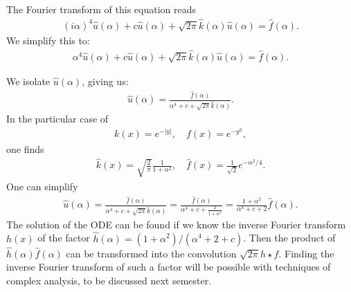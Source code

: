 \documentclass[11pt]{article}
\begin{document}
\begin{solution}
    The Fourier transform of this equation reads
    \begin{align}
        (i\alpha)^{4} \hat u(\alpha) + c \hat u(\alpha) + \sqrt{2\pi} \hat k(\alpha) \hat u(\alpha) = \hat f(\alpha)
        .
    \end{align}
    We simplify this to:
    \begin{align}
        \alpha^{4} \hat u(\alpha) + c \hat u(\alpha) + \sqrt{2\pi} \hat k(\alpha) \hat u(\alpha) = \hat f(\alpha)
        .
    \end{align}
    
    We isolate $\hat u(\alpha)$, giving us:
    \begin{align}
        \hat u(\alpha)
        =
        \frac{\hat f(\alpha)}{ \alpha^{4} + c + \sqrt{2\pi} \hat k(\alpha) }
        .
    \end{align}
    In the particular case of 
    \begin{align}
        k(x) = e^{-|y|},
        \quad 
        f(x) = e^{-y^{2}},
    \end{align}
    one finds
    \begin{align}
        \hat k(x) = \sqrt{\frac{2}{\pi}} \frac{1}{1 + \alpha^{2}},
        \quad 
        \hat f(x) = \frac{1}{\sqrt{2}} e^{-\alpha^{2}/4}.
    \end{align}
    One can simplify
    \begin{align}
        \hat u(\alpha)
        =
        \frac{\hat f(\alpha)}{ \alpha^{4} + c + \sqrt{2\pi} \hat k(\alpha) }
        =
        \frac{\hat f(\alpha)}{ \alpha^{4} + c + \frac{2}{1 + \alpha^{2}} }
        =
        \frac{1 + \alpha^{2}}{ \alpha^{4} + c + 2 } \hat f(\alpha)
        .
    \end{align}
    The solution of the ODE can be found if we know the inverse Fourier transform $h(x)$ of the factor $\hat h(\alpha) = (1+\alpha^{2})/(\alpha^{4}+2+c)$.
    Then the product of $\hat h(\alpha) \hat f(\alpha)$ can be transformed into the convolution $\sqrt{2\pi} h \star f$. 
    Finding the inverse Fourier transform of such a factor will be possible with techniques of complex analysis, 
    to be discussed next semester. 
\end{solution}
\end{document}
